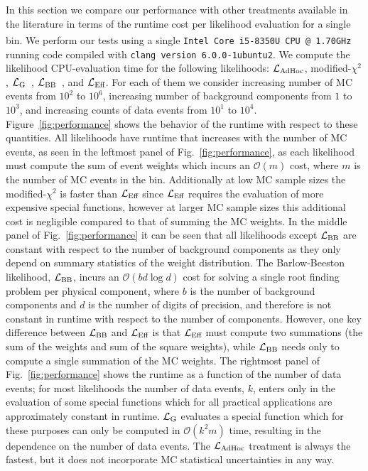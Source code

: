 In this section we compare our performance with other treatments available in the literature in terms of the runtime cost per likelihood evaluation for a single bin.
We perform our tests using a single \texttt{Intel\textsuperscript{\textregistered} Core\texttrademark{} i5-8350U CPU @ 1.70GHz} running code compiled with \texttt{clang version 6.0.0-1ubuntu2}.
We compute the likelihood CPU-evaluation time for the following likelihoods: $\mathcal{L}_{\textmd{AdHoc}}$, modified-$\chi^2$, $\mathcal{L}_\textmd{G}$~\cite{Glusenkamp:2017rlp}, $\mathcal{L}_{\textmd{BB}}$~\cite{Barlow:1993dm}, and $\mathcal{L}_\textmd{Eff}$.
For each of them we consider increasing number of MC events from $10^2$ to $10^6$, increasing number of background components from $1$ to $10^3$, and increasing counts of data events from $10^1$ to $10^4$.
Figure~\ref{fig:performance} shows the behavior of the runtime with respect to these quantities.
All likelihoods have runtime that increases with the number of MC events, as seen in the leftmost panel of Fig.~\ref{fig:performance}, as each likelihood must compute the sum of event weights which incurs an $\mathcal{O}(m)$ cost, where $m$ is the number of MC events in the bin.
Additionally at low MC sample sizes the modified-$\chi^2$ is faster than $\mathcal{L}_\textmd{Eff}$ since $\mathcal{L}_\textmd{Eff}$ requires the evaluation of more expensive special functions, however at larger MC sample sizes this additional cost is negligible compared to that of summing the MC weights.
In the middle panel of Fig.~\ref{fig:performance} it can be seen that all likelihoods except $\mathcal{L}_{\textmd{BB}}$ are constant with respect to the number of background components as they only depend on summary statistics of the weight distribution.
The Barlow-Beeston likelihood, $\mathcal{L}_{\textmd{BB}}$, incurs an $\mathcal{O}(b d \log d)$ cost for solving a single root finding problem per physical component, where $b$ is the number of background components and $d$ is the number of digits of precision, and therefore is not constant in runtime with respect to the number of components.
However, one key difference between $\mathcal{L}_{\textmd{BB}}$ and $\mathcal{L}_\textmd{Eff}$ is that $\mathcal{L}_\textmd{Eff}$ must compute two summations (the sum of the weights and sum of the square weights), while $\mathcal{L}_{\textmd{BB}}$ needs only to compute a single summation of the MC weights.
The rightmost panel of Fig.~\ref{fig:performance} shows the runtime as a function of the number of data events; for most likelihoods the number of data events, $k$, enters only in the evaluation of some special functions which for all practical applications are approximately constant in runtime.
$\mathcal{L}_\textmd{G}$ evaluates a special function which for these purposes can only be computed in $\mathcal{O}(k^2 m)$ time, resulting in the dependence on the number of data events.
The $\mathcal{L}_{\textmd{AdHoc}}$ treatment is always the fastest, but it does not incorporate MC statistical uncertainties in any way.

